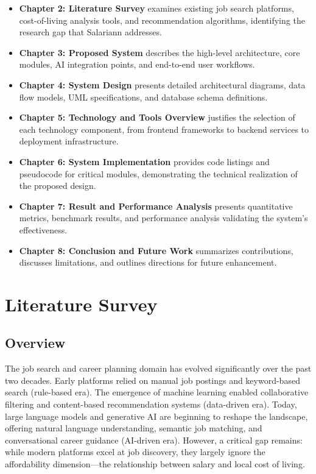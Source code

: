\begin{itemize}
    \item \textbf{Chapter 2: Literature Survey} examines existing job search platforms, cost-of-living analysis tools, and recommendation algorithms, identifying the research gap that Salariann addresses.
    
    \item \textbf{Chapter 3: Proposed System} describes the high-level architecture, core modules, AI integration points, and end-to-end user workflows.
    
    \item \textbf{Chapter 4: System Design} presents detailed architectural diagrams, data flow models, UML specifications, and database schema definitions.
    
    \item \textbf{Chapter 5: Technology and Tools Overview} justifies the selection of each technology component, from frontend frameworks to backend services to deployment infrastructure.
    
    \item \textbf{Chapter 6: System Implementation} provides code listings and pseudocode for critical modules, demonstrating the technical realization of the proposed design.
    
    \item \textbf{Chapter 7: Result and Performance Analysis} presents quantitative metrics, benchmark results, and performance analysis validating the system's effectiveness.
    
    \item \textbf{Chapter 8: Conclusion and Future Work} summarizes contributions, discusses limitations, and outlines directions for future enhancement.
\end{itemize}

\chapter{Literature Survey}

\section{Overview}

The job search and career planning domain has evolved significantly over the past two decades. Early platforms relied on manual job postings and keyword-based search (rule-based era). The emergence of machine learning enabled collaborative filtering and content-based recommendation systems (data-driven era). Today, large language models and generative AI are beginning to reshape the landscape, offering natural language understanding, semantic job matching, and conversational career guidance (AI-driven era). However, a critical gap remains: while modern platforms excel at job discovery, they largely ignore the affordability dimension---the relationship between salary and local cost of living.

